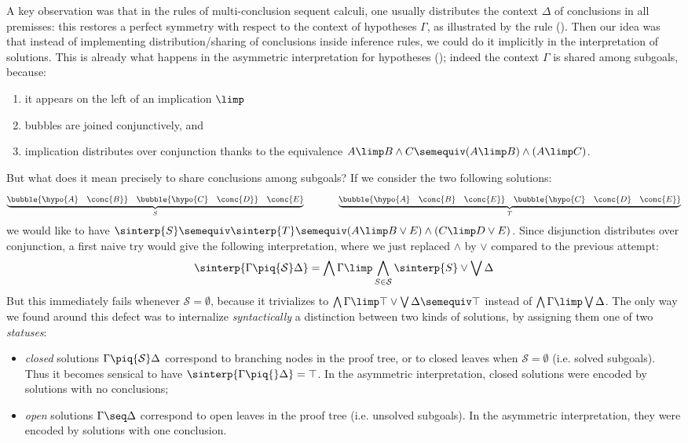A key observation was that in the rules of multi-conclusion sequent calculi, one
usually distributes the context $\Delta$ of conclusions in all premisses: this
restores a perfect symmetry with respect to the context of hypotheses $\Gamma$,
as illustrated by the {} rule (). Then our
idea was that instead of implementing distribution/sharing of conclusions inside
inference rules, we could do it implicitly in the interpretation of solutions.
This is already what happens in the asymmetric interpretation for hypotheses
(); indeed the context $\Gamma$ is shared among subgoals,
because:
\begin{enumerate}
  \item it appears on the left of an implication $\limp$
  \item bubbles are joined conjunctively, and
  \item implication distributes over conjunction thanks to the equivalence $A
  \limp B \land C \semequiv (A \limp B) \land (A \limp C)$.
\end{enumerate}
But what does it mean precisely to share conclusions among subgoals? If we
consider the two following solutions:
$$
\underbrace{\bubble{\hypo{A}~~~\conc{B}}~~~\bubble{\hypo{C}~~~\conc{D}}~~~\conc{E}}_{S} \qquad\qquad
\underbrace{\bubble{\hypo{A}~~~\conc{B}~~~\conc{E}}~~~\bubble{\hypo{C}~~~\conc{D}~~~\conc{E}}}_{T}
$$
we would like to have $\sinterp{S} \semequiv \sinterp{T} \semequiv (A \limp B
\lor E) \land (C \limp D \lor E)$. Since disjunction distributes over
conjunction, a first naive try would give the following interpretation, where we
just replaced $\land$ by $\lor$ compared to the previous attempt:
$$
\sinterp{\Gamma \piq{\mathcal{S}} \Delta} =
\bigwedge{\Gamma} \limp \bigwedge_{S \in \mathcal{S}}{\sinterp{S}} \lor \bigvee \Delta
$$
But this immediately fails whenever $\mathcal{S} = \emptyset$, because it
trivializes to $\bigwedge \Gamma \limp \top \lor \bigvee \Delta \semequiv \top$
instead of $\bigwedge \Gamma \limp \bigvee \Delta$. The only way we found around
this defect was to internalize \emph{syntactically} a distinction between two
kinds of solutions, by assigning them one of two \emph{statuses}:
\begin{itemize}
  \item \emph{closed} solutions $\Gamma \piq{\mathcal{S}} \Delta$ correspond
  to branching nodes in the proof tree, or to closed leaves when $\mathcal{S} =
  \emptyset$ (i.e. solved subgoals). Thus it becomes sensical to have
  $\sinterp{\Gamma \piq{} \Delta} = \top$. In the asymmetric interpretation,
  closed solutions were encoded by solutions with no conclusions;
  \item \emph{open} solutions $\Gamma \seq \Delta$ correspond to open leaves
  in the proof tree (i.e. unsolved subgoals). In the asymmetric interpretation,
  they were encoded by solutions with one conclusion.
\end{itemize}
